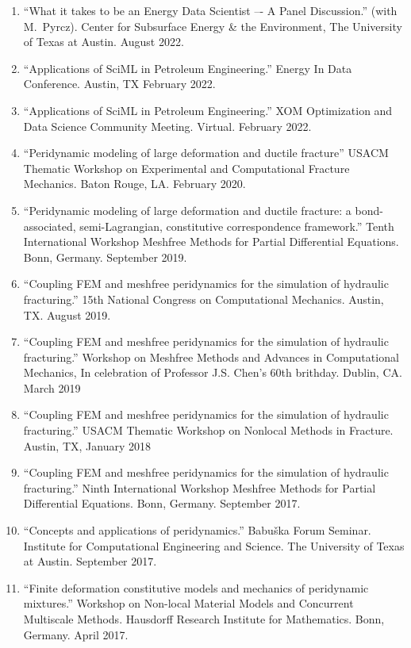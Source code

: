 \begin{etaremune}
\else
\begin{enumerate}
\fi
    \item ``What it takes to be an Energy Data Scientist –- A Panel Discussion.'' (with M.\ Pyrcz). Center for Subsurface Energy \& the Environment, The University of Texas at Austin.  August 2022.
    \item ``Applications of SciML in Petroleum Engineering.'' Energy In Data Conference. Austin, TX February 2022.
    \item ``Applications of SciML in Petroleum Engineering.'' XOM Optimization and Data Science Community Meeting.  Virtual. February 2022.
    \item ``Peridynamic modeling of large deformation and ductile fracture'' USACM Thematic Workshop on Experimental and Computational Fracture Mechanics. Baton Rouge, LA. February 2020.
    \item ``Peridynamic modeling of large deformation and ductile fracture: a bond-associated, semi-Lagrangian, constitutive correspondence framework.'' Tenth International Workshop Meshfree Methods for Partial Differential Equations. Bonn, Germany. September 2019.
    \item ``Coupling FEM and meshfree peridynamics for the simulation of hydraulic fracturing.'' 15th National Congress on Computational Mechanics. Austin, TX. August 2019.
    \item ``Coupling FEM and meshfree peridynamics for the simulation of hydraulic fracturing.'' Workshop on Meshfree Methods and Advances in Computational Mechanics, In celebration of Professor J.S. Chen's 60th brithday.  Dublin, CA.  March 2019
    \item ``Coupling FEM and meshfree peridynamics for the simulation of hydraulic fracturing.'' USACM Thematic Workshop on Nonlocal Methods in Fracture.  Austin, TX, January 2018
    \item ``Coupling FEM and meshfree peridynamics for the simulation of hydraulic fracturing.'' Ninth International Workshop Meshfree Methods for Partial Differential Equations. Bonn, Germany. September 2017.
    \item ``Concepts and applications of peridynamics.'' Babu\v{s}ka Forum Seminar. Institute for Computational Engineering and Science. The University of Texas at Austin. September 2017.
    \item ``Finite deformation constitutive models and mechanics of peridynamic mixtures.'' Workshop on Non-local Material Models and Concurrent Multiscale Methods. Hausdorff Research Institute for Mathematics.  Bonn, Germany.  April 2017.

\end{enumerate}
\end{etaremune}
